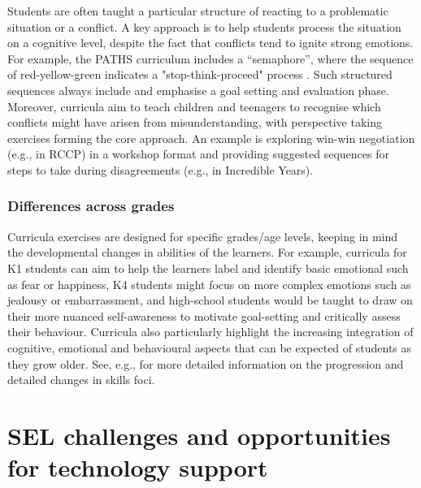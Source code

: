\documentclass[prodmode,acmtochi]{acmsmall}
\begin{document}
Students are often taught a particular structure of reacting to a problematic situation or a conflict.
%
A key approach is to help students process the situation on a cognitive level, despite the fact that conflicts tend to ignite strong emotions. For example, the PATHS curriculum includes a ``semaphore'', where the sequence of red-yellow-green indicates a "stop-think-proceed" process \cite{Kam2004,Domitrovich2007}. Such structured sequences always include and emphasise a goal setting and evaluation phase. Moreover, curricula aim to teach children and teenagers to recognise which conflicts might have arisen from misunderstanding, with perspective taking exercises forming the core approach. An example is exploring win-win negotiation (e.g., in RCCP) in a workshop format and providing suggested sequences for steps to take during disagreements (e.g., in Incredible Years).




\subsubsection{Differences across grades}
\label{sec:ageDiff}
Curricula exercises are designed for specific grades/age levels, keeping in mind the developmental changes in abilities of the learners. For example, curricula for K1 students can aim to help the learners label and identify basic emotional such as fear or happiness, K4 students might focus on more complex emotions such as jealousy or embarrassment, and high-school students would be taught to draw on their more nuanced self-awareness to motivate goal-setting and critically assess their behaviour. Curricula also particularly highlight the increasing integration of cognitive, emotional and behavioural aspects that can be expected of students as they grow older. See, e.g.,  for more detailed information on the progression and detailed changes in skills foci. 







\section{SEL challenges and opportunities for technology support}
\label{sec:HCIsupport}
\end{document}
